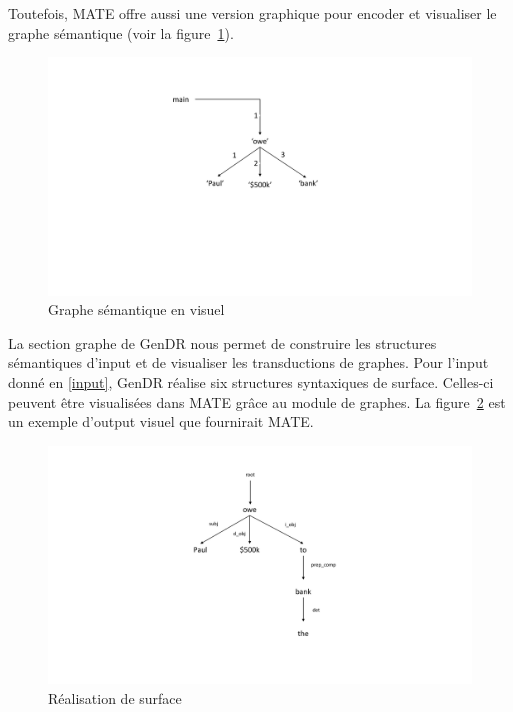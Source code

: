 Toutefois, MATE offre aussi une version graphique pour encoder et visualiser le graphe sémantique (voir la figure~\ref{fig:graphesem}).

\begin{figure}[htb]
	\centering
	\includegraphics[width=1\textwidth, trim = {0cm 7cm 0cm 3cm},clip]{ch3/figs/owe_sem.pdf}
	\caption{Graphe sémantique en visuel}
	\label{fig:graphesem}
\end{figure}


La section graphe de GenDR nous permet de construire les structures sémantiques d'input et de visualiser les transductions de graphes. Pour l'input donné en \ref{input}, GenDR réalise six structures syntaxiques de surface. Celles-ci peuvent être visualisées dans MATE grâce au module de graphes. La figure~\ref{fig:realsurfex} est un exemple d'output visuel que fournirait MATE. 

\begin{figure}[htb]
	\centering
	\includegraphics[width=1\textwidth, trim = {0cm 3cm 0cm 2cm},clip]{ch3/figs/realsurfex.pdf}
	\caption{Réalisation de surface}
	\label{fig:realsurfex}
\end{figure}

